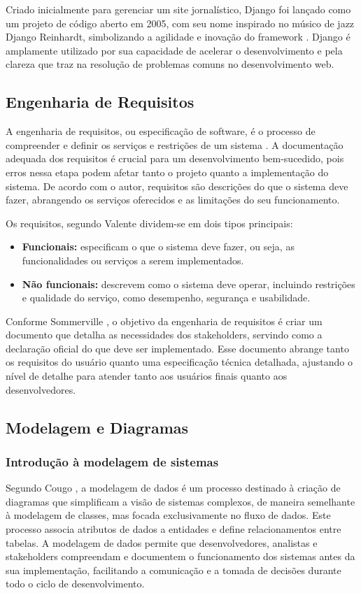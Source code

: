 Criado inicialmente para gerenciar um site jornalístico, Django foi lançado como um projeto de código aberto em 2005, com seu nome inspirado no músico de jazz Django Reinhardt, simbolizando a agilidade e inovação do framework \cite{meireles2010}. Django é amplamente utilizado por sua capacidade de acelerar o desenvolvimento e pela clareza que traz na resolução de problemas comuns no desenvolvimento web.

\subsection{Engenharia de Requisitos}
A engenharia de requisitos, ou especificação de software, é o processo de compreender e definir os serviços e restrições de um sistema \cite{sommerville2011}. A documentação adequada dos requisitos é crucial para um desenvolvimento bem-sucedido, pois erros nessa etapa podem afetar tanto o projeto quanto a implementação do sistema. De acordo com o autor, requisitos são descrições do que o sistema deve fazer, abrangendo os serviços oferecidos e as limitações do seu funcionamento.

Os requisitos, segundo Valente \cite{valente2020} dividem-se em dois tipos principais:

\begin{itemize}
    \item \textbf{Funcionais:} especificam o que o sistema deve fazer, ou seja, as funcionalidades ou serviços a serem implementados.
    \item \textbf{Não funcionais:} descrevem como o sistema deve operar, incluindo restrições e qualidade do serviço, como desempenho, segurança e usabilidade.
\end{itemize}

Conforme Sommerville \cite{sommerville2011}, o objetivo da engenharia de requisitos é criar um documento que detalha as necessidades dos stakeholders, servindo como a declaração oficial do que deve ser implementado. Esse documento abrange tanto os requisitos do usuário quanto uma especificação técnica detalhada, ajustando o nível de detalhe para atender tanto aos usuários finais quanto aos desenvolvedores.

\subsection{Modelagem e Diagramas}

\subsubsection{Introdução à modelagem de sistemas}
Segundo Cougo \cite{cougo1997}, a modelagem de dados é um processo destinado à criação de diagramas que simplificam a visão de sistemas complexos, de maneira semelhante à modelagem de classes, mas focada exclusivamente no fluxo de dados. Este processo associa atributos de dados a entidades e define relacionamentos entre tabelas. A modelagem de dados permite que desenvolvedores, analistas e stakeholders compreendam e documentem o funcionamento dos sistemas antes da sua implementação, facilitando a comunicação e a tomada de decisões durante todo o ciclo de desenvolvimento.

